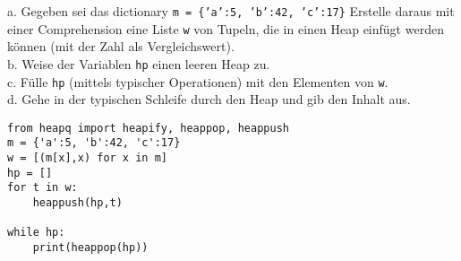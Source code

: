 \question[5]
a. Gegeben sei das dictionary \texttt{m = \{'a':5, 'b':42, 'c':17\}}
Erstelle daraus mit einer Comprehension eine Liste \texttt{w} von Tupeln,
die in einen Heap einfügt werden können (mit der Zahl als Vergleichswert).  \\
b. Weise der Variablen \texttt{hp} einen leeren Heap zu. \\
c. Fülle \texttt{hp} (mittels typischer Operationen) mit den Elementen von
\texttt{w}. \\
d. Gehe in der typischen Schleife durch den Heap und gib den Inhalt aus.
\begin{solutionbox}{5cm}
\begin{lstlisting}
from heapq import heapify, heappop, heappush
m = {'a':5, 'b':42, 'c':17}
w = [(m[x],x) for x in m]
hp = []
for t in w:
    heappush(hp,t)

while hp:
    print(heappop(hp))
\end{lstlisting}
\end{solutionbox}
